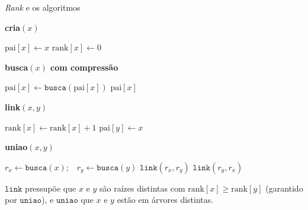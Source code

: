 \documentclass[aspectratio=169,10pt]{beamer}
\newcommand{\Busca}{\mathtt{busca}}
\newcommand{\Uniao}{\mathtt{uniao}}
\newcommand{\Link}{\mathtt{link}}
\begin{document}
\begin{frame}[t]{\textit{Rank} e os algoritmos}
  \footnotesize
  \begin{minipage}[t]{.43\linewidth}
    \textbf{cria$(x)$}
    \begin{algorithmic}[1]
      \State $\mathrm{pai}[x]\gets x$
      \State $\mathrm{rank}[x]\gets0$
    \end{algorithmic}
  \end{minipage}
  \hfill
  \begin{minipage}[t]{.53\linewidth}
    \textbf{busca$(x)$ com compressão}
    \begin{algorithmic}[1]
      \State $\mathrm{pai}[x]\gets\Busca(\mathrm{pai}[x])$
      \EndIf
      \State \Return $\mathrm{pai}[x]$
    \end{algorithmic}
  \end{minipage}

  \bigskip
  \begin{minipage}[t]{.43\linewidth}
    \textbf{link$(x,y)$}
    \begin{algorithmic}[1]
      \State $\mathrm{rank}[x]\gets\mathrm{rank}[x]+1$
      \EndIf
      \State $\mathrm{pai}[y]\gets x$
    \end{algorithmic}
  \end{minipage}
  \hfill
  \begin{minipage}[t]{.53\linewidth}
    \textbf{uniao$(x,y)$}
    \begin{algorithmic}[1]
      \State $r_x\gets\Busca(x)$;\ \ $r_y\gets\Busca(y)$
      \State $\Link(r_x,r_y)$
      \Else
      \State $\Link(r_y,r_x)$
      \EndIf
    \end{algorithmic}
  \end{minipage}

  \bigskip
  $\Link$ pressupõe que $x$ e $y$ são raízes distintas com
  $\mathrm{rank}[x]\geq\mathrm{rank}[y]$ (garantido por $\Uniao$), e
  $\Uniao$ que $x$ e $y$ estão em árvores distintas.
\end{frame}
\end{document}
